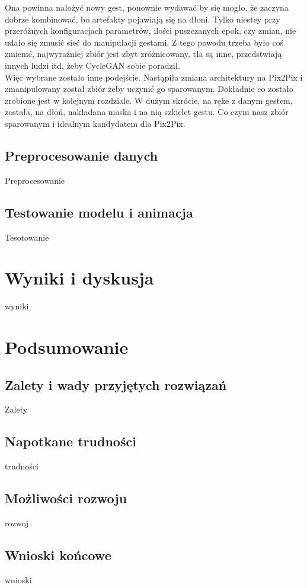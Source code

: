 \documentclass[12pt]{article}
\begin{document}
\begin{sloppypar}
{{    Ona powinna nałożyć nowy gest, ponownie wydawać by się mogło, że zaczyna dobrze kombinować, bo artefakty pojawiają się na dłoni. 
    Tylko niestey przy przeróżnych konfiguracjach parametrów, ilości puszczanych epok, czy zmian, nie udało się zmusić sieć do manipulacji gestami.
    Z tego powodu trzeba było coś zmienić, najwyraźniej zbiór jest zbyt zróżnicowany, tła są inne, przedstwiają innych ludzi itd, żeby CycleGAN sobie poradził. \\
    Więc wybrane zostało inne podejście. Nastąpiła zmiana architektury na Pix2Pix i zmanipulowany został zbiór żeby uczynić go sparowanym. 
    Dokładnie co zostało zrobione jest w kolejnym rozdziale. W dużym skrócie, na ręke z danym gestem, została, na dłoń, nakładana maska i na nią szkielet gestu.
    Co czyni nasz zbiór sparowanym i idealnym kandydatem dla Pix2Pix.
  }
  \subsection{Preprocesowanie danych}
  {
    Preprocesowanie
  }
  \subsection{Testowanie modelu i animacja}
  {
    Tesotowanie
  }
}

\section{Wyniki i dyskusja}
{
  wyniki
}

\section{Podsumowanie}
{
  \subsection{Zalety i wady przyjętych rozwiązań}
  {
    Zalety
  }
  \subsection{Napotkane trudności}
  {
    trudności
  }
  \subsection{Możliwości rozwoju}
  {
    rozwoj
  }
  \subsection{Wnioski końcowe}
  {
    wnioski
  }
}

\clearpage
\printbibliography[
  heading=bibintoc,
  title={Bibliografia}
]

\clearpage
\listoffigures

\clearpage
\listoftables

\clearpage
{}
\lstlistoflistings

\end{sloppypar}
\end{document}
